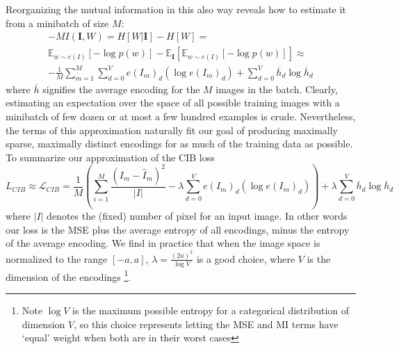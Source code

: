 Reorganizing the mutual information in this also way reveals how to estimate it from a minibatch of size $M$:
\begin{equation}
\begin{split}
    -MI\left(\mathbf{I}, W\right) = H[W | \mathbf{I}] - H[W] = \\
    \mathbb{E}_{w \sim e(I)}\left[ -\log p(w) \right] - \mathbb{E}_\mathbf{I}\left[ \mathbb{E}_{w \sim e(I)}\left[ -\log p(w) \right] \right] \approx \\
    -\frac{1}{M} \sum_{m=1}^M \sum_{d=0}^V e(I_m)_d (\log e(I_m)_d) +
            \sum_{d=0}^V \overline{h}_d \log \overline{h}_d
    \end{split}
\end{equation}
where $\overline{h}$ signifies the average encoding for the $M$ images in the batch. Clearly, estimating an expectation over the space of all possible training images with a minibatch of few dozen or at most a few hundred examples is crude. Nevertheless, the terms of this approximation naturally fit our goal of producing maximally sparse, maximally distinct encodings for as much of the training data as possible. To summarize our approximation of the CIB loss
\begin{equation}
L_{CIB} \approx \mathcal{L}_{CIB} = \frac{1}{M} \left( \sum_{i=1}^M \frac{(I_m - \hat{I}_m)^2}{|I|}
                                    - \lambda \sum_{d=0}^V e(I_m)_d (\log e(I_m)_d) \right)+
                                     \lambda \sum_{d=0}^V \overline{h}_d \log \overline{h}_d
\end{equation}
where $|I|$ denotes the (fixed) number of pixel for an input image. In other words our loss is the MSE plus the average entropy of all encodings, minus the entropy of the average encoding. We find in practice that when the image space is normalized to the range $[-a,a]$, $\lambda = \frac{(2a)^2}{\log V}$ is a good choice, where $V$ is the dimension of the encodings \footnote{Note $\log V$ is the maximum possible entropy for a categorical distribution of dimension $V$, so this choice represents letting the MSE and MI terms have `equal' weight when both are in their worst cases}.

